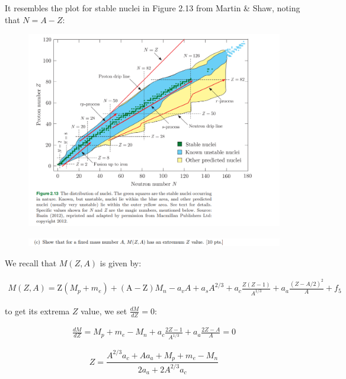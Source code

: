 \documentclass[11pt]{article}
\theoremstyle{definition}
\begin{document}
It resembles the plot for stable nuclei in Figure 2.13 from Martin \& Shaw, noting that $N=A-Z$:

\begin{figure}[H]
    \centering
    \includegraphics[scale = 0.5]{2.13.png}
\end{figure}

\newpage



\begin{figure}[H]
    \centering
    \includegraphics[scale = 0.5]{1c.png}
\end{figure}

We recall that $M(Z,A)$ is given by:

\begin{align}\label{mza}
    M(Z,A) = 
    \text{Z}(M_p + m_e) + (\text{A}-\text{Z})M_n 
    - a_v  A
    + a_s A^{2/3}
    + a_c \frac{Z(Z-1)}{A^{1/3}}
    + a_a \frac{(Z-A/2)^2}{A}
    + f_5
\end{align}

to get its extrema $Z$ value, we set $\frac{dM}{dZ} = 0$:

\begin{align}
    \frac{dM}{dZ} =
    M_p + m_e -M_n 
    + a_c \frac{2Z-1}{A^{1/3}}
    + a_a \frac{2Z-A}{A}
    =0
\end{align}

\begin{equation}\label{za2}
    \boxed{
        Z = \frac{A^{2/3}a_c + Aa_a + M_p + m_e - M_n}{2a_a + 2A^{2/3}a_c}
    }
    \end{equation}
\newpage
\end{document}
